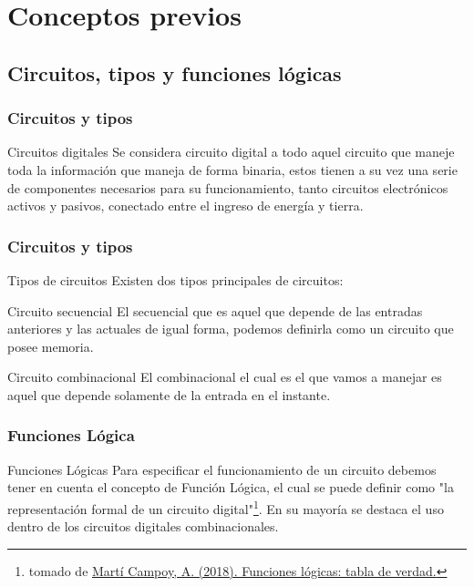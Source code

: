 \documentclass[aspectratio=169]{beamer}
\begin{document}
\section{Conceptos previos}

\subsection{Circuitos, tipos y funciones lógicas}

\begin{frame}
\frametitle{Circuitos y tipos}

\begin{block}{Circuitos digitales}
Se considera circuito digital a \alert{todo aquel circuito que maneje toda la información que maneja de forma binaria}, estos tienen a su vez una serie de componentes necesarios para su funcionamiento, tanto \alert{circuitos electrónicos activos y pasivos}, conectado entre el ingreso de energía y tierra.
\end{block}

\end{frame}

\begin{frame}
\frametitle{Circuitos y tipos}
\begin{block}{Tipos de circuitos}
Existen dos tipos principales de circuitos:
\end{block}

\begin{exampleblock}{Circuito secuencial}
El secuencial que es aquel que depende de las entradas anteriores y las actuales de igual forma, podemos definirla como un circuito que posee memoria.
\end{exampleblock}

\begin{alertblock}{Circuito combinacional}
El combinacional el cual es el que vamos a manejar es aquel que depende solamente de la entrada en el instante.
\end{alertblock}
\end{frame}

\begin{frame}
\frametitle{Funciones Lógica}
\begin{block}{Funciones Lógicas}
Para especificar el funcionamiento de un circuito debemos tener en cuenta el concepto de Función Lógica, el cual se puede definir como  \alert{"la representación formal de un circuito digital"}\footnote{tomado de \href{https://cutt.ly/Funciones_Logicas}{Martí Campoy, A. (2018). Funciones lógicas: tabla de verdad.}}. En su mayoría se destaca el uso dentro de los circuitos digitales combinacionales.
\end{block}
\end{frame}
\end{document}
